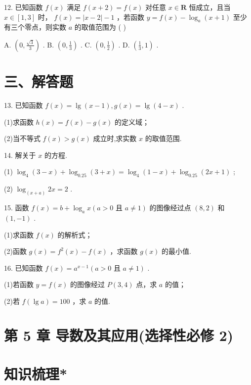 12. 已知函数 $f\left( x\right)$ 满足 $f\left( {x + 2}\right)  = f\left( x\right)$ 对任意 $x \in  \mathbf{R}$ 恒成立，且当 $x \in  \left\lbrack  {1,3}\right\rbrack$ 时， $f\left( x\right)  = \left| {x - 2}\right|  - 1$ ，若函数 $y  = f\left( x\right)  - {\log }_{a}\left( {x + 1}\right)$ 至少有三个零点，则实数 $a$ 的取值范围为 ( )

A. $\left( {0,\frac{\sqrt{3}}{3}}\right)$ . B. $\left( {0,\frac{1}{3}}\right)$ . C. $\left( {0,\frac{1}{2}}\right)$ . D. $\left( {\frac{1}{3},1}\right)$ .

\section*{三、解答题}

13. 已知函数 $f\left( x\right)  = \lg \left( {x - 1}\right) ,g\left( x\right)  = \lg \left( {4 - x}\right)$ .

(1)求函数 $h\left( x\right)  = f\left( x\right)  - g\left( x\right)$ 的定义域；

(2)当不等式 $f\left( x\right)  > g\left( x\right)$ 成立时,求实数 $x$ 的取值范围.

14. 解关于 $x$ 的方程.

(1) ${\log }_{4}\left( {3 - x}\right)  + {\log }_{0.25}\left( {3 + x}\right)  = {\log }_{4}\left( {1 - x}\right)  + {\log }_{0.25}\left( {{2x} + 1}\right)$ ;

(2) ${\log }_{\left( x + a\right) }{2x} = 2$ .

15. 函数 $f\left( x\right)  = b + {\log }_{a}x\left( {a > 0\text{ 且 }a \neq  1}\right)$ 的图像经过点 $\left( {8,2}\right)$ 和 $\left( {1, - 1}\right)$ .

(1)求函数 $f\left( x\right)$ 的解析式；

(2)函数 $g\left( x\right)  = {f}^{2}\left( x\right)  - f\left( x\right)$ ，求函数 $g\left( x\right)$ 的最小值.

16. 已知函数 $f\left( x\right)  = {a}^{x - 1}\left( {a > 0\text{ 且 }a \neq  1}\right)$ .

(1)若函数 $y = f\left( x\right)$ 的图像经过 $P\left( {3,4}\right)$ 点，求 $a$ 的值；

(2)若 $f\left( {\lg a}\right)  = {100}$ ，求 $a$ 的值.


\section*{第 5 章 导数及其应用(选择性必修 2)}

\section*{知识梳理*}

